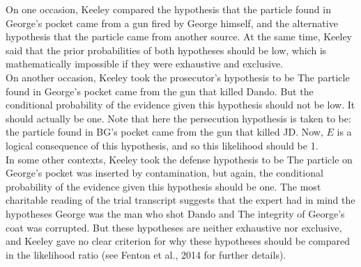 \documentclass[10pt,dvipsnames,enabledeprecatedfontcommands]{scrartcl}
\begin{document}
\noindent  On one occasion, Keeley compared the hypothesis that the
particle found in George's pocket came from a gun fired by George
himself, and the alternative hypothesis that the particle came from
another source. At the same time, Keeley said that the prior
probabilities of both hypotheses should be low, which is mathematically
impossible if they were exhaustive and exclusive.\\
On another occasion, Keeley took the prosecutor's hypothesis to be
\textsf{The particle found in George's pocket came from the gun that killed Dando}.
But the conditional probability of the evidence given this hypothesis
should not be low. It should actually be one. \noindent Note that here
the persecution hypothesis is taken to be:
\textsf{the particle found in BG's pocket came from the gun that killed JD.}
Now, \(E\) is a logical consequence of this hypothesis, and so this
likelihood should be 1.\\
In some other contexts, Keeley took the defense hypothesis to be
\textsf{The particle on George's pocket was inserted by contamination},
but again, the conditional probability of the evidence given this
hypothesis should be one. The most charitable reading of the trial
transcript suggests that the expert had in mind the hypotheses
\textsf{George was the man who shot Dando} and
\textsf{The integrity of George's coat was corrupted.} But these
hypotheses are neither exhaustive nor exclusive, and Keeley gave no
clear criterion for why these hypotheses should be compared in the
likelihood ratio (see Fenton et al., 2014 for further details).
\end{document}
